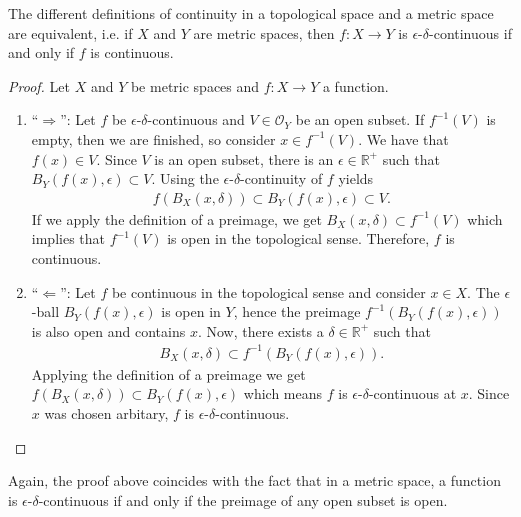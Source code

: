 \begin{thmbox}
    \begin{proposition}
        The different definitions of continuity in a topological space and a metric space are equivalent, i.e. if \(X\) and \(Y\) are metric spaces, then \(f: X \longrightarrow Y\) is \(\epsilon\)-\(\delta\)-continuous if and only if \(f\) is continuous.
    \end{proposition}
\end{thmbox}
\begin{proof}
    Let \(X\) and \(Y\) be metric spaces and \(f: X \longrightarrow Y\) a function.
    \begin{enumerate}
        \item ``\(\Rightarrow\)'': Let \(f\) be \(\epsilon\)-\(\delta\)-continuous and \(V \in \mathcal{O}_Y\) be an open subset. If \(f^{-1}(V)\) is empty, then we are finished, so consider \(x \in f^{-1}(V)\). We have that \(f(x) \in V\). Since \(V\) is an open subset, there is an \(\epsilon \in \mathbb{R}^+\) such that \(B_Y(f(x), \epsilon) \subset V\). Using the \(\epsilon\)-\(\delta\)-continuity of \(f\) yields
        \begin{align*}
            f(B_X(x, \delta)) \subset B_Y(f(x), \epsilon) \subset V \text{.}
        \end{align*}
        If we apply the definition of a preimage, we get \(B_X(x, \delta) \subset f^{-1}(V)\) which implies that \(f^{-1}(V)\) is open in the topological sense. Therefore, \(f\) is continuous.
        \item ``\(\Leftarrow\)'': Let \(f\) be continuous in the topological sense and consider \(x \in X\). The \(\epsilon\)-ball \(B_Y(f(x), \epsilon)\) is open in \(Y\), hence the preimage \(f^{-1}(B_Y(f(x), \epsilon))\) is also open and contains \(x\). Now, there exists a \(\delta \in \mathbb{R}^+\) such that
        \begin{align*}
            B_X(x, \delta) \subset f^{-1}(B_Y(f(x), \epsilon)) \text{.}
        \end{align*}
        Applying the definition of a preimage we get \(f(B_X(x, \delta)) \subset B_Y(f(x), \epsilon)\) which means \(f\) is \(\epsilon\)-\(\delta\)-continuous at \(x\). Since \(x\) was chosen arbitary, \(f\) is \(\epsilon\)-\(\delta\)-continuous.
    \end{enumerate}
\end{proof}

\begin{rembox}
    \begin{remark}
        Again, the proof above coincides with the fact that in a metric space, a function is \(\epsilon\)-\(\delta\)-continuous if and only if the preimage of any open subset is open.
    \end{remark}
\end{rembox}

